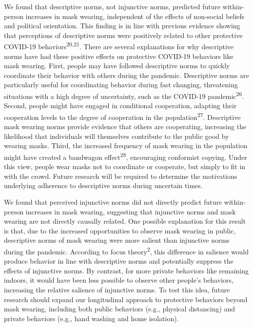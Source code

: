 \documentclass[
  man, donotrepeattitle,floatsintext]{apa6}
\begin{document}
We found that descriptive norms, not injunctive norms, predicted future within-person increases in mask wearing, independent of the effects of non-social beliefs and political orientation. This finding is in line with previous evidence showing that perceptions of descriptive norms were positively related to other protective COVID-19 behaviors\textsuperscript{20,21}. There are several explanations for why descriptive norms have had these positive effects on protective COVID-19 behaviors like mask wearing. First, people may have followed descriptive norms to quickly coordinate their behavior with others during the pandemic. Descriptive norms are particularly useful for coordinating behavior during fast changing, threatening situations with a high degree of uncertainty, such as the COVID-19 pandemic\textsuperscript{26}. Second, people might have engaged in conditional cooperation, adapting their cooperation levels to the degree of cooperation in the population\textsuperscript{27}. Descriptive mask wearing norms provide evidence that others are cooperating, increasing the likelihood that individuals will themselves contribute to the public good by wearing masks. Third, the increased frequency of mask wearing in the population might have created a bandwagon effect\textsuperscript{28}, encouraging conformist copying. Under this view, people wear masks not to coordinate or cooperate, but simply to fit in with the crowd. Future research will be required to determine the motivations underlying adherence to descriptive norms during uncertain times.

We found that perceived injunctive norms did not directly predict future within-person increases in mask wearing, suggesting that injunctive norms and mask wearing are not directly causally related. One possible explanation for this result is that, due to the increased opportunities to observe mask wearing in public, descriptive norms of mask wearing were more salient than injunctive norms during the pandemic. According to focus theory\textsuperscript{2}, this difference in salience would produce behavior in line with descriptive norms and potentially suppress the effects of injunctive norms. By contrast, for more private behaviors like remaining indoors, it would have been less possible to observe other people's behaviors, increasing the relative salience of injunctive norms. To test this idea, future research should expand our longitudinal approach to protective behaviors beyond mask wearing, including both public behaviors (e.g., physical distancing) and private behaviors (e.g., hand washing and home isolation).
\end{document}
